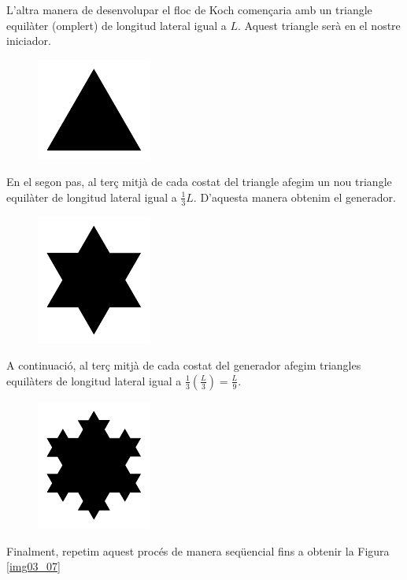 \documentclass[12pt,a4paper]{report}
\begin{document}
L'altra manera de desenvolupar el floc de Koch començaria amb un triangle equilàter (omplert) de longitud lateral igual a $L$. Aquest triangle serà en el nostre iniciador. 

\begin{figure}[!ht]
\centering
\includegraphics[scale=1]{img/img03_06_koch_01.pdf}
\end{figure}

En el segon pas, al terç mitjà de cada costat del triangle afegim un nou triangle equilàter de longitud lateral igual a $\displaystyle\frac{1}{3}L$. D'aquesta manera obtenim el generador.

\begin{figure}[!ht]
\centering
\includegraphics[scale=1]{img/img03_06_koch_02.pdf}
\end{figure}
\newpage
A continuació, al terç mitjà de cada costat del generador afegim triangles equilàters de longitud lateral  igual a $\displaystyle\frac{1}{3}\left(\frac{L}{3}\right)=\frac{L}{9}$.
\begin{figure}[!h]
\centering
\includegraphics[scale=1]{img/img03_06_koch_03.pdf}
\end{figure}

Finalment, repetim aquest procés de manera seqüencial fins a obtenir la Figura \ref{img03_07} 
\end{document}
